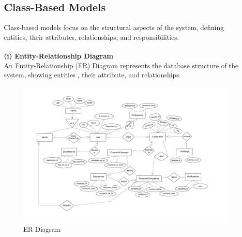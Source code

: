 \documentclass[a4paper,12pt]{article}
\begin{document}
\subsection{Class-Based Models}
Class-based models focus on the structural aspects of the system, defining entities, their attributes, relationships, and responsibilities.
\\ \\ 
\noindent \textbf{(i) Entity-Relationship Diagram} \\
An Entity-Relationship (ER) Diagram represents the database structure of the system, showing entities , their attribute, and relationships.
\begin{figure}[H]
    \centering
    \includegraphics[width=1\linewidth]{photos/erd.png}
    \caption{ER Diagram}
    \label{fig:enter-label}
\end{figure}
\end{document}
